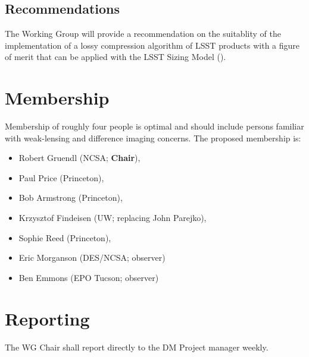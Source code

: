 \subsection{Recommendations}

The Working Group will provide a recommendation on the suitablity of the implementation
of a lossy compression algorithm of LSST products with a figure of merit that can be 
applied with the LSST Sizing Model ().


\section{Membership}

Membership of roughly four people is optimal and should include persons familiar 
with weak-lensing and difference imaging concerns.
The proposed membership is:

\begin{itemize}
    \item Robert Gruendl (NCSA; \textbf{Chair}),
    \item Paul Price (Princeton),
    \item Bob Armstrong (Princeton),
    \item Krzysztof Findeisen (UW; replacing John Parejko),
    \item Sophie Reed (Princeton),
    \item Eric Morganson (DES/NCSA; observer)
    \item Ben Emmons (EPO Tucson; observer)
\end{itemize}


\section{Reporting}

The WG Chair shall report directly to the DM Project manager weekly.
